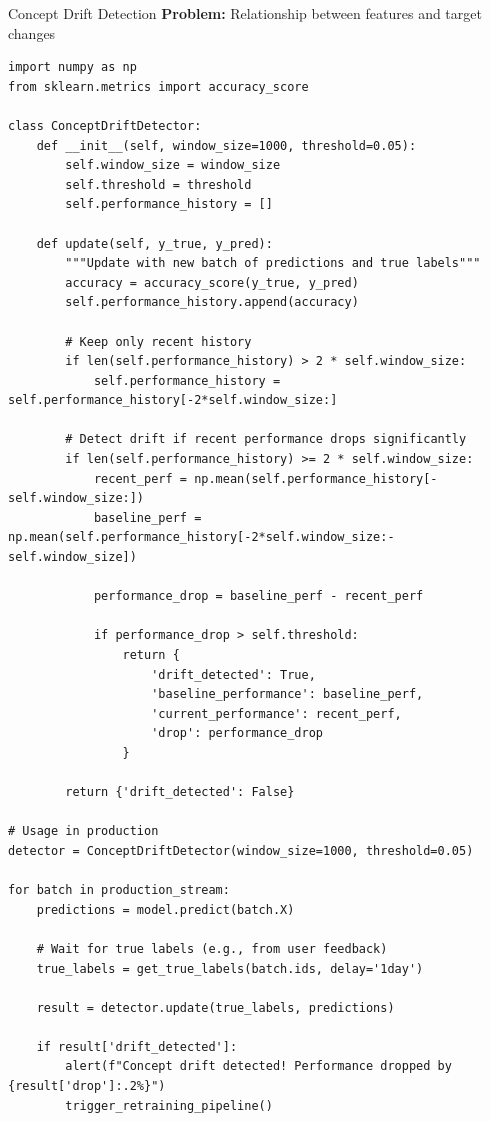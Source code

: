 \begin{frame}[fragile]{Concept Drift Detection}
\textbf{Problem:} Relationship between features and target changes

\vspace{0.2cm}
\begin{lstlisting}[basicstyle=\ttfamily\tiny]
import numpy as np
from sklearn.metrics import accuracy_score

class ConceptDriftDetector:
    def __init__(self, window_size=1000, threshold=0.05):
        self.window_size = window_size
        self.threshold = threshold
        self.performance_history = []

    def update(self, y_true, y_pred):
        """Update with new batch of predictions and true labels"""
        accuracy = accuracy_score(y_true, y_pred)
        self.performance_history.append(accuracy)

        # Keep only recent history
        if len(self.performance_history) > 2 * self.window_size:
            self.performance_history = self.performance_history[-2*self.window_size:]

        # Detect drift if recent performance drops significantly
        if len(self.performance_history) >= 2 * self.window_size:
            recent_perf = np.mean(self.performance_history[-self.window_size:])
            baseline_perf = np.mean(self.performance_history[-2*self.window_size:-self.window_size])

            performance_drop = baseline_perf - recent_perf

            if performance_drop > self.threshold:
                return {
                    'drift_detected': True,
                    'baseline_performance': baseline_perf,
                    'current_performance': recent_perf,
                    'drop': performance_drop
                }

        return {'drift_detected': False}

# Usage in production
detector = ConceptDriftDetector(window_size=1000, threshold=0.05)

for batch in production_stream:
    predictions = model.predict(batch.X)

    # Wait for true labels (e.g., from user feedback)
    true_labels = get_true_labels(batch.ids, delay='1day')

    result = detector.update(true_labels, predictions)

    if result['drift_detected']:
        alert(f"Concept drift detected! Performance dropped by {result['drop']:.2%}")
        trigger_retraining_pipeline()
\end{lstlisting}
\end{frame}

